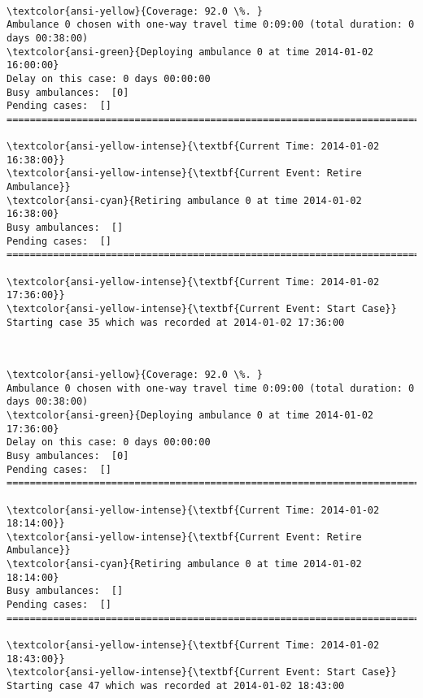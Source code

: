\documentclass[11pt]{article}
\begin{document}
    \begin{center}
    \end{center}
    { \hspace*{\fill} \\}
    
    \begin{Verbatim}[commandchars=\\\{\}]
\textcolor{ansi-yellow}{Coverage: 92.0 \%. }
Ambulance 0 chosen with one-way travel time 0:09:00 (total duration: 0 days 00:38:00)
\textcolor{ansi-green}{Deploying ambulance 0 at time 2014-01-02 16:00:00}
Delay on this case: 0 days 00:00:00
Busy ambulances:  [0]
Pending cases:  []
========================================================================

\textcolor{ansi-yellow-intense}{\textbf{Current Time: 2014-01-02 16:38:00}}
\textcolor{ansi-yellow-intense}{\textbf{Current Event: Retire Ambulance}}
\textcolor{ansi-cyan}{Retiring ambulance 0 at time 2014-01-02 16:38:00}
Busy ambulances:  []
Pending cases:  []
========================================================================

\textcolor{ansi-yellow-intense}{\textbf{Current Time: 2014-01-02 17:36:00}}
\textcolor{ansi-yellow-intense}{\textbf{Current Event: Start Case}}
Starting case 35 which was recorded at 2014-01-02 17:36:00

    \end{Verbatim}

    \begin{center}
    \end{center}
    { \hspace*{\fill} \\}
    
    \begin{Verbatim}[commandchars=\\\{\}]
\textcolor{ansi-yellow}{Coverage: 92.0 \%. }
Ambulance 0 chosen with one-way travel time 0:09:00 (total duration: 0 days 00:38:00)
\textcolor{ansi-green}{Deploying ambulance 0 at time 2014-01-02 17:36:00}
Delay on this case: 0 days 00:00:00
Busy ambulances:  [0]
Pending cases:  []
========================================================================

\textcolor{ansi-yellow-intense}{\textbf{Current Time: 2014-01-02 18:14:00}}
\textcolor{ansi-yellow-intense}{\textbf{Current Event: Retire Ambulance}}
\textcolor{ansi-cyan}{Retiring ambulance 0 at time 2014-01-02 18:14:00}
Busy ambulances:  []
Pending cases:  []
========================================================================

\textcolor{ansi-yellow-intense}{\textbf{Current Time: 2014-01-02 18:43:00}}
\textcolor{ansi-yellow-intense}{\textbf{Current Event: Start Case}}
Starting case 47 which was recorded at 2014-01-02 18:43:00

    \end{Verbatim}
\end{document}
